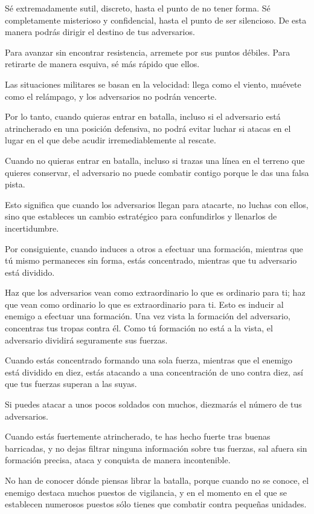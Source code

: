 Sé extremadamente sutil, discreto, hasta el punto de no tener forma. Sé completamente misterioso y confidencial, hasta el punto de ser silencioso. De esta manera podrás dirigir el destino de tus adversarios.

Para avanzar sin encontrar resistencia, arremete por sus puntos débiles. Para retirarte de manera esquiva, sé más rápido que ellos.

Las situaciones militares se basan en la velocidad: llega como el viento, muévete como el relámpago, y los adversarios no podrán vencerte.

Por lo tanto, cuando quieras entrar en batalla, incluso si el adversario está atrincherado en una posición defensiva, no podrá evitar luchar si atacas en el lugar en el que debe acudir irremediablemente al rescate.

Cuando no quieras entrar en batalla, incluso si trazas una línea en el terreno que quieres conservar, el adversario no puede combatir contigo porque le das una falsa pista.

Esto significa que cuando los adversarios llegan para atacarte, no luchas con ellos, sino que estableces un cambio estratégico para confundirlos y llenarlos de incertidumbre.

Por consiguiente, cuando induces a otros a efectuar una formación, mientras que tú mismo permaneces sin forma, estás concentrado, mientras que tu adversario está dividido.

Haz que los adversarios vean como extraordinario lo que es ordinario para ti; haz que vean como ordinario lo que es extraordinario para ti. Esto es inducir al enemigo a efectuar una formación. Una vez vista la formación del adversario, concentras tus tropas contra él. Como tú formación no está a la vista, el adversario dividirá seguramente sus fuerzas.

Cuando estás concentrado formando una sola fuerza, mientras que el enemigo está dividido en diez, estás atacando a una concentración de uno contra diez, así que tus fuerzas superan a las suyas.

Si puedes atacar a unos pocos soldados con muchos, diezmarás el número de tus adversarios.

Cuando estás fuertemente atrincherado, te has hecho fuerte tras buenas barricadas, y no dejas filtrar ninguna información sobre tus fuerzas, sal afuera sin formación precisa, ataca y conquista de manera incontenible.

No han de conocer dónde piensas librar la batalla, porque cuando no se conoce, el enemigo destaca muchos puestos de vigilancia, y en el momento en el que se establecen numerosos puestos sólo tienes que combatir contra pequeñas unidades.

